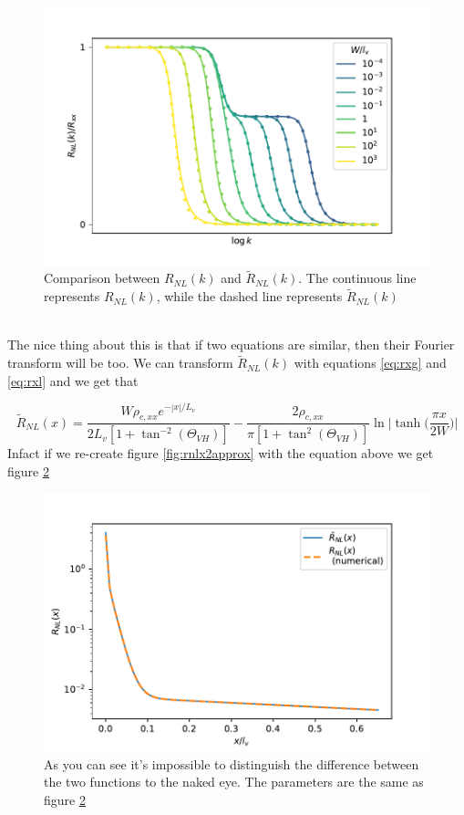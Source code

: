\begin{figure}[h!]
    \centering
    \includegraphics[width=\linewidth]{Immagini/rnl/kapproxcomp.pdf}
    \caption{Comparison between $R_{NL}(k)$ and $\tilde R_{NL}(k)$. The continuous line represents $R_{NL}(k)$, while the dashed line represents $\tilde R_{NL}(k)$}
    \label{fig:kapproxcomp}
\end{figure}\\
The nice thing about this is that if two equations are similar, then their Fourier transform will be too. We can transform $\tilde R_{NL}(k)$ with equations \ref{eq:rxg} and \ref{eq:rxl} and we get that

\begin{equation}
    \boxed{
        \tilde R_{NL}(x)=
        \frac{W \rho_{c,xx}e^{-|x|/L_v}}{2L_v[1+\tan^{-2}(\Theta_{VH})]}-
        \frac{2\rho_{c,xx}}{\pi [1+\tan^2(\Theta_{VH})]}\ln \bigg|\tanh \Big(\frac{\pi x}{2W}\Big)\bigg|
    }
\end{equation}
Infact if we re-create figure \ref{fig:rnlx2approx} with the equation above we get figure \ref{fig:rnlxapprox}
\begin{figure}[h!]
    \centering
    \includegraphics[width=\linewidth]{Immagini/rnl/xapprox.pdf}
    \caption{As you can see it's impossible to distinguish the difference between the two functions to the naked eye. The parameters are the same as figure \ref{fig:rnlxapprox}}
    \label{fig:rnlxapprox}
\end{figure}